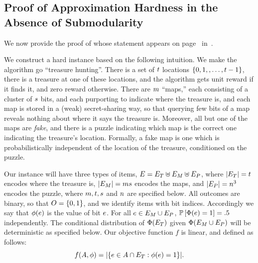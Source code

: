 %

%

\subsection{Proof of Approximation Hardness in the Absence of \Term
  Submodularity}  \label{sec:proof-approx-hardness}

We now provide the proof of  whose statement 
appears on page~\pageref{thm:hardness} in~.\\


%
\begin{proofof}{}
%
%
%
%
%
%
%
%
%
%
%
%
%
%
%
%
%
%
%
%
%
%
We construct a hard instance based on the following
intuition.  We make the algorithm go ``treasure hunting''.  There is a
set of $t$ locations $\left\{0, 1,, \ldots, t-1\right\}$, there is a treasure
at one of these locations, and the algorithm gets unit reward if it
finds it, and zero reward otherwise.  There are $m$ ``maps,''
each consisting of a cluster of $s$ bits, and each
purporting to indicate where the treasure is, and each map is stored
in a (weak) secret-sharing way, so that querying few bits of a map
reveals nothing about where it says the treasure is.
Moreover, all but one of the maps are \emph{fake}, and there is a 
puzzle indicating which map is the correct one
indicating the treasure's location.  Formally, a fake map is one
which is probabilistically independent of the location of the treasure,
conditioned on the puzzle.


Our instance will have three types of items, $E =
  E_T \uplus E_M \uplus E_{P}$, where
  $|E_{T}|=t$ encodes where the treasure is,
  $|E_{M}|=m s$ encodes the maps, and
  $|E_{P}|=n^{3}$ encodes the puzzle, where 
 $m,t,s$ and $n$ are specified below.
  All outcomes are binary, so that $O=\{0,1\}$, and we
  identify items with bit indices.  Accordingly we say that 
  ${\color{black}{\ensuremath{\phi}}}(e)$ is the value of bit $e$.
  For all $e\in
  E_{M}\cup E_{P}$, $\mathbb{P}\left[{\color{black}{\ensuremath{\Phi}}}(e)=1\right] =.5$
  independently. The conditional distribution of 
  ${\color{black}{\ensuremath{\Phi}}}(E_{T})$ given ${\color{black}{\ensuremath{\Phi}}}(E_{M}\cup E_{P})$
  will be deterministic as specified below. Our objective function $f$
  is linear, and defined as follows:
$$f(A,{\color{black}{\ensuremath{\phi}}})=|\{e\in A\cap E_{T}:{\color{black}{\ensuremath{\phi}}}(e)=1\}|.$$



\end{proofof}
